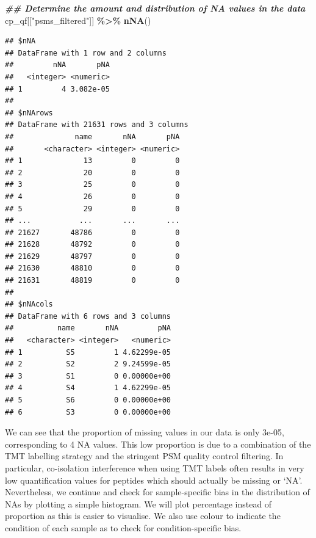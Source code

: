 \documentclass[9pt,a4paper,]{extarticle}
\newenvironment{Shaded}{\begin{snugshade}}{\end{snugshade}}
\newcommand{\DocumentationTok}[1]{\textcolor[rgb]{0.56,0.35,0.01}{\textbf{\textit{#1}}}}
\newcommand{\FunctionTok}[1]{\textcolor[rgb]{0.13,0.29,0.53}{\textbf{#1}}}
\newcommand{\NormalTok}[1]{#1}
\newcommand{\SpecialCharTok}[1]{\textcolor[rgb]{0.81,0.36,0.00}{\textbf{#1}}}
\newcommand{\StringTok}[1]{\textcolor[rgb]{0.31,0.60,0.02}{#1}}
\begin{document}
\begin{Shaded}
\begin{Highlighting}[]
\DocumentationTok{\#\# Determine the amount and distribution of NA values in the data}
\NormalTok{cp\_qf[[}\StringTok{"psms\_filtered"}\NormalTok{]] }\SpecialCharTok{\%\textgreater{}\%}
  \FunctionTok{nNA}\NormalTok{()}
\end{Highlighting}
\end{Shaded}

\begin{verbatim}
## $nNA
## DataFrame with 1 row and 2 columns
##         nNA       pNA
##   <integer> <numeric>
## 1         4 3.082e-05
## 
## $nNArows
## DataFrame with 21631 rows and 3 columns
##              name       nNA       pNA
##       <character> <integer> <numeric>
## 1              13         0         0
## 2              20         0         0
## 3              25         0         0
## 4              26         0         0
## 5              29         0         0
## ...           ...       ...       ...
## 21627       48786         0         0
## 21628       48792         0         0
## 21629       48797         0         0
## 21630       48810         0         0
## 21631       48819         0         0
## 
## $nNAcols
## DataFrame with 6 rows and 3 columns
##          name       nNA         pNA
##   <character> <integer>   <numeric>
## 1          S5         1 4.62299e-05
## 2          S2         2 9.24599e-05
## 3          S1         0 0.00000e+00
## 4          S4         1 4.62299e-05
## 5          S6         0 0.00000e+00
## 6          S3         0 0.00000e+00
\end{verbatim}

We can see that the proportion of missing values in our data is only 3e-05, corresponding to 4 NA values. This low proportion is due to a
combination of the TMT labelling strategy and the stringent PSM quality control
filtering. In particular, co-isolation interference when using TMT labels often
results in very low quantification values for peptides which should actually be
missing or `NA'. Nevertheless, we continue and check for sample-specific bias in
the distribution of NAs by plotting a simple histogram. We will plot percentage
instead of proportion as this is easier to visualise. We also use colour to
indicate the condition of each sample as to check for condition-specific bias.
\end{document}
